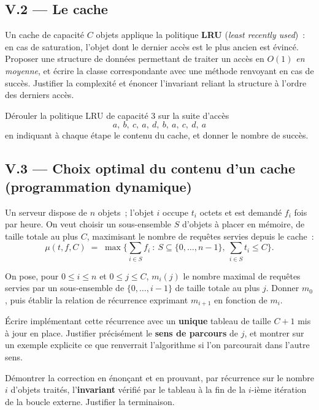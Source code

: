 \documentclass[11pt,a4paper]{article}
\begin{document}
\subsection*{V.2 --- Le cache}

\Q Un cache de capacité $C$ objets applique la politique \textbf{LRU} (\emph{least recently
used})~: en cas de saturation, l'objet dont le dernier accès est le plus ancien est évincé.
Proposer une structure de données permettant de traiter un accès en $O(1)$ \emph{en moyenne},
et écrire la classe correspondante avec une méthode  renvoyant 
en cas de succès. Justifier la complexité et énoncer l'invariant reliant la structure à
l'ordre des derniers accès.

\Q Dérouler la politique LRU de capacité $3$ sur la suite d'accès
\[ a,\ b,\ c,\ a,\ d,\ b,\ a,\ c,\ d,\ a \]
en indiquant à chaque étape le contenu du cache, et donner le nombre de succès.

\subsection*{V.3 --- Choix optimal du contenu d'un cache (programmation dynamique)}

Un serveur dispose de $n$ objets~; l'objet $i$ occupe $t_i$ octets et est demandé $f_i$ fois
par heure. On veut choisir un sous-ensemble $S$ d'objets à placer en mémoire, de taille
totale au plus $C$, maximisant le nombre de requêtes servies depuis le cache~:
\[ \mu(t,f,C) \;=\; \max\Big\{\textstyle\sum_{i\in S}f_i \ :\ S\subseteq\{0,\dots,n-1\},\
\sum_{i\in S}t_i\le C\Big\}. \]

\Q On pose, pour $0\le i\le n$ et $0\le j\le C$, $m_i(j)$ le nombre maximal de requêtes
servies par un sous-ensemble de $\{0,\dots,i-1\}$ de taille totale au plus $j$. Donner
$m_0$, puis établir la relation de récurrence exprimant $m_{i+1}$ en fonction de $m_i$.

\Q Écrire  implémentant cette récurrence avec un \textbf{unique}
tableau de taille $C+1$ mis à jour en place. Justifier précisément le \textbf{sens de
parcours} de $j$, et montrer sur un exemple explicite ce que renverrait l'algorithme si l'on
parcourait dans l'autre sens.

\Q Démontrer la correction en énonçant et en prouvant, par récurrence sur le nombre $i$
d'objets traités, l'\textbf{invariant} vérifié par le tableau à la fin de la $i$-ième
itération de la boucle externe. Justifier la terminaison.
\end{document}
